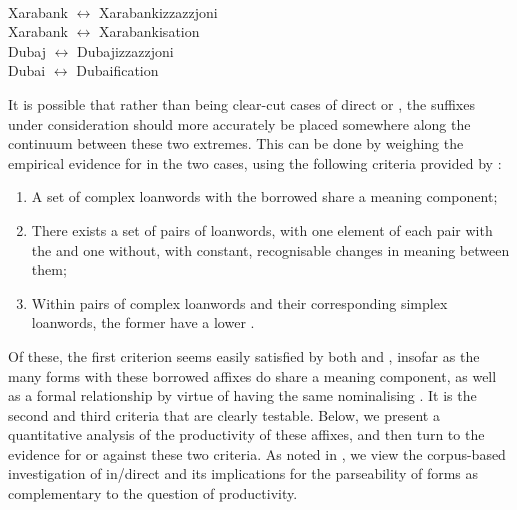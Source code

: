 \documentclass[output=paper]{LSP/langsci}
\begin{document}
\ea\label{ex:zjoni-name}
\\
\gll Xarabank $\leftrightarrow$ Xarabankizzazzjoni\\
	 Xarabank $\leftrightarrow$ Xarabankisation\\
\gll Dubaj $\leftrightarrow$ Dubajizzazzjoni \\
	Dubai $\leftrightarrow$ Dubaification\\
\z

It is possible that rather than being clear-cut cases of direct or , the suffixes under consideration should more accurately be placed somewhere along the continuum between these two extremes. This can be done by weighing the empirical evidence for  in the two cases, using the following criteria provided by \citet[p. 513]{Seifart2015}:

\begin{enumerate}
\item A set of complex loanwords with the borrowed  share a meaning component;
\item There exists a set of pairs of loanwords, with one element of each pair with the  and one without, with constant, recognisable changes in meaning between them;
\item Within pairs of complex loanwords and their corresponding simplex loanwords, the former have a lower .
\end{enumerate}

Of these, the first criterion seems easily satisfied by both {\ar} and \zjoni, insofar as the many forms with these borrowed affixes do share a meaning component, as well as a formal relationship by virtue of having the same nominalising . It is the second and third criteria that are clearly testable. Below, we present a quantitative analysis of the productivity of these affixes, and then turn to the evidence for or against these two criteria. As noted in , we view the corpus-based investigation of in/direct  and its implications for the parseability of forms \citep{Hay2001} as complementary to the question of productivity.
\end{document}
